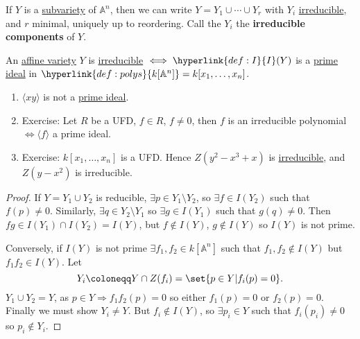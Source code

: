 \documentclass{article}
\newcommand{\A}{\mathbb{A}}
\begin{document}
\begin{ex}
    If $Y$ is a \hyperlink{def:Z}{subvariety} of $\A^n$, then we can write $Y = Y_1 \cup \dotsb \cup Y_r$ with $Y_i$ \hyperlink{def:reducible}{irreducible}, and $r$ minimal, uniquely up to reordering.
    Call the $Y_i$ the \textbf{irreducible components} of $Y$.
\end{ex}
\begin{prop}
    An \hyperlink{def:Z}{affine variety} $Y$ is \hyperlink{def:reducible}{irreducible} $\iff \hyperlink{def:I}{I}(Y)$ is a \hyperlink{def:prime}{prime ideal} in $\hyperlink{def:polys}{k[\A^n]} = k[x_1, \dotsc, x_n]$.
\end{prop}
\begin{eg}
    \leavevmode
    \begin{enumerate}[label=(\roman*)]
        \item $\langle x y\rangle$ is not a \hyperlink{def:prime}{prime ideal}.
        \item Exercise: Let $R$ be a UFD, $f \in R$, $f \neq 0$, then $f$ is an irreducible polynomial $\iff \langle f \rangle$ a prime ideal.
        \item Exercise: $k[x_1, \dotsc, x_n]$ is a UFD.
            Hence $Z(y^2 - x^3 + x)$ is \hyperlink{def:reducible}{irreducible}, and $Z(y-x^2)$ is irreducible.
    \end{enumerate}
\end{eg}
\begin{proof}
    If $Y = Y_1 \cup Y_2$ is reducible, $\exists p \in Y_1 \setminus Y_2$, so $\exists f \in I(Y_2)$ such that $f(p) \neq 0$.
    Similarly, $\exists q \in Y_2 \setminus Y_1$ so $\exists g \in I(Y_1)$ such that $g(q) \neq 0$.
    Then $fg \in I(Y_1) \cap I(Y_2) = I(Y)$, but $f \notin I(Y)$, $g \notin I(Y)$ so $I(Y)$ is not prime.
    \begin{center}
    \end{center}

    Conversely, if $I(Y)$ is not prime $\exists f_1, f_2 \in k[\A^n]$ such that $f_1, f_2 \notin I(Y)$ but $f_1 f_2 \in I(Y)$.
    Let \begin{equation*}Y_i \coloneqq Y \cap Z(f_i) = \set{p \in Y | f_i(p) = 0}.\end{equation*} $Y_1 \cup Y_2 = Y$, as $p \in Y \Rightarrow f_1 f_2 (p) = 0$ so either $f_1(p) = 0$ or $f_2(p) = 0$.
    Finally we must show $Y_i \neq Y$. But $f_i \notin I(Y)$, so $\exists p_i \in Y$ such that $f_i(p_i) \neq 0$ so $p_i \notin Y_i$.
\end{proof}
\end{document}

